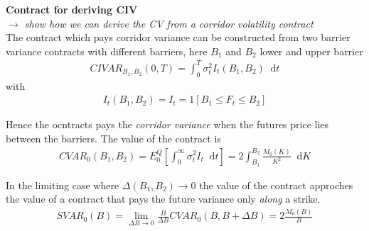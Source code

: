 \documentclass{article}
\newcommand*\diff{\mathop{}\!\mathrm{d}}
\begin{document}
\textbf{Contract for deriving CIV}\\
\textit{$\rightarrow$ show how we can derive the CV from a corridor volatility contract}\\

The contract which pays corridor variance can be constructed from two barrier variance contracts with different barriers, here $B_{1}$ and $B_{2}$ lower and upper barrier
\begin{align*}
CIV AR_{B_{1}, B_{2}}(0,T) = \int_{0}^{T} \sigma_{t}^{2}I_{t}(B_{1}, B_{2}) \diff t
\end{align*}
with 
\begin{align*}
I_{t}(B_{1}, B_{2}) = I_{t} = 1[B_{1} \leq F_{t} \leq B_{2}]
\end{align*}

Hence the ocntracts pays the \textit{corridor variance} when the futures price lies between the barriers. The value of the contract is
\begin{align*}
CV AR_{0}(B_{1}, B_{2}) = E_{0}^{Q} \left[ \int_{0}^{\infty} \sigma_{t}^{2} I_{t} \diff t \right] = 2 \int_{B_{1}}^{B_{2}} \frac{M_{0}(K)}{K^{2}} \diff K
\end{align*}

In the limiting case where $\Delta (B_{1}, B_{2}) \rightarrow 0$ the value of the contract approches the value of a contract that pays the future variance only \textit{along} a strike. 
\begin{align*}
SV AR_{0}(B) = \lim_{\Delta B \rightarrow 0} \frac{B}{\Delta B} CV AR_{0}(B, B + \Delta B) = 2 \frac{M_{0}(B)}{B}
\end{align*}
\end{document}
